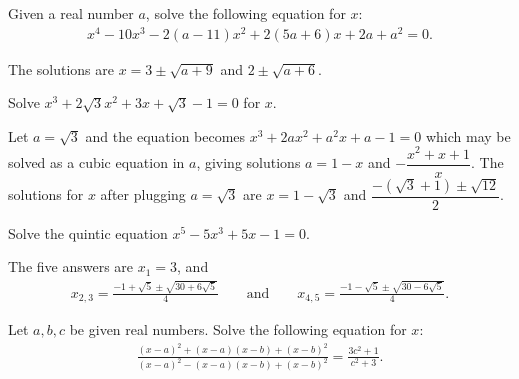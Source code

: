\begin{question}
    Given a real number $a$, solve the following equation for $x$:
    \begin{align*}
        x^4-10x^3-2(a-11)x^2+2(5a+6)x+2a+a^2=0.
    \end{align*}
\end{question}

\begin{solution}
    The solutions are $x=3\pm\sqrt{a+9}$ and $2\pm\sqrt{a+6}$.
\end{solution}

\begin{question}
    Solve $x^3+2\sqrt 3 x^2 + 3x + \sqrt 3 - 1 = 0$ for $x$.
\end{question}

\begin{solution}
    Let $a=\sqrt 3$ and the equation becomes $x^3+2ax^2+a^2x+a-1=0$ which may be solved as a cubic equation in $a$, giving solutions $a=1-x$ and $-\dfrac{x^2+x+1}{x}$. The solutions for $x$ after plugging $a=\sqrt 3$ are $x=1-\sqrt 3$ and $\dfrac{-(\sqrt 3 + 1) \pm \sqrt{12}}{2}$.
\end{solution}

\begin{question}
    Solve the quintic equation $x^5-5x^3+5x-1=0$.
\end{question}

\begin{solution}
    The five answers are $x_1=3$, and
    \begin{align*}
        x_{2,3}=\frac{-1+\sqrt5 \pm \sqrt{30+6\sqrt{5}}}{4} \qquad \text{and} \qquad x_{4,5} = \frac{-1-\sqrt5 \pm \sqrt{30-6\sqrt{5}}}{4}.
    \end{align*}
\end{solution}

\begin{question}
    Let $a,b,c$ be given real numbers. Solve the following equation for $x$:
    \begin{align*}
        \frac{(x-a)^2+(x-a)(x-b)+(x-b)^2}{(x-a)^2-(x-a)(x-b)+(x-b)^2} = \frac{3c^2+1}{c^2+3}.
    \end{align*}
\end{question}

